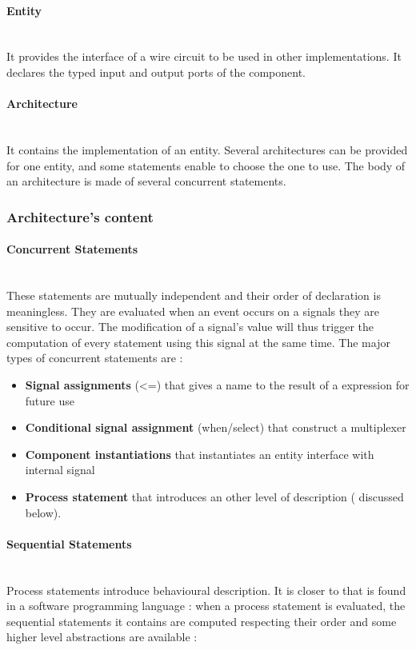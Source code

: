 \documentclass[10pt,a4paper]{article}
\begin{document}
\paragraph{Entity}~\\
It provides the interface of a wire circuit to be used in other implementations. It declares the typed input and output ports of the component.

\paragraph{Architecture}~\\
It contains the implementation of an entity. Several architectures can be provided for one entity, and some statements enable to choose the one to use. The body of an architecture is made of several concurrent statements.

\subsubsection{Architecture's content}

\paragraph{Concurrent Statements}
~\\ \label{Concurr}
These statements are mutually independent and their order of declaration is meaningless. They are evaluated when an event occurs on a signals they are sensitive to occur. The modification of a signal's value will thus trigger the computation of every statement using this signal at the same time. The major types of concurrent statements are :

\begin{itemize}
	\item \textbf{Signal assignments} (\textless=) that gives a name to the result of a expression for future use
	\item \textbf{Conditional signal assignment} (when/select) that construct a multiplexer
	\item \textbf{Component instantiations} that instantiates an entity interface with internal signal
	\item \textbf{Process statement} that introduces an other level of description ( discussed below).
\end{itemize}


\paragraph{Sequential Statements}
~\\
Process statements introduce behavioural description. It is closer to that is found in a software programming language : when a process statement is evaluated, the sequential statements it contains are computed respecting their order and some higher level abstractions are available :
\end{document}
